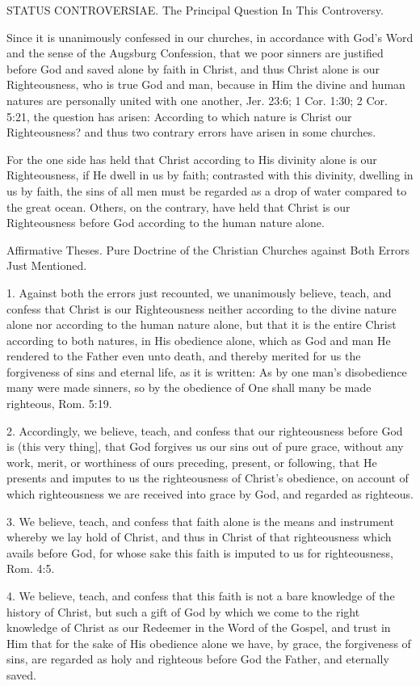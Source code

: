 STATUS CONTROVERSIAE.
The Principal Question In This Controversy.

Since it is unanimously confessed in our churches, in accordance with God's Word and the sense of the Augsburg Confession, that we poor sinners are justified before God and saved alone by faith in Christ, and thus Christ alone is our Righteousness, who is true God and man, because in Him the divine and human natures are personally united with one another, Jer. 23:6; 1 Cor. 1:30; 2 Cor. 5:21, the question has arisen: According to which nature is Christ our Righteousness? and thus two contrary errors have arisen in some churches.

For the one side has held that Christ according to His divinity alone is our Righteousness, if He dwell in us by faith; contrasted with this divinity, dwelling in us by faith, the sins of all men must be regarded as a drop of water compared to the great ocean. Others, on the contrary, have held that Christ is our Righteousness before God according to the human nature alone.

Affirmative Theses.
Pure Doctrine of the Christian Churches against Both Errors Just Mentioned.

1. Against both the errors just recounted, we unanimously believe, teach, and confess that Christ is our Righteousness neither according to the divine nature alone nor according to the human nature alone, but that it is the entire Christ according to both natures, in His obedience alone, which as God and man He rendered to the Father even unto death, and thereby merited for us the forgiveness of sins and eternal life, as it is written: As by one man's disobedience many were made sinners, so by the obedience of One shall many be made righteous, Rom. 5:19.

2. Accordingly, we believe, teach, and confess that our righteousness before God is (this very thing], that God forgives us our sins out of pure grace, without any work, merit, or worthiness of ours preceding, present, or following, that He presents and imputes to us the righteousness of Christ's obedience, on account of which righteousness we are received into grace by God, and regarded as righteous.

3. We believe, teach, and confess that faith alone is the means and instrument whereby we lay hold of Christ, and thus in Christ of that righteousness which avails before God, for whose sake this faith is imputed to us for righteousness, Rom. 4:5.

4. We believe, teach, and confess that this faith is not a bare knowledge of the history of Christ, but such a gift of God by which we come to the right knowledge of Christ as our Redeemer in the Word of the Gospel, and trust in Him that for the sake of His obedience alone we have, by grace, the forgiveness of sins, are regarded as holy and righteous before God the Father, and eternally saved.

